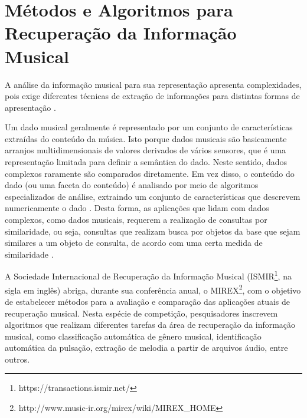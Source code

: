 \section{Métodos e Algoritmos para Recuperação da Informação Musical} \label{cap:metodos}

A análise da informação musical para sua representação apresenta complexidades, pois exige diferentes técnicas de extração de informações para distintas formas de apresentação \cite{downie2003}.

Um dado musical geralmente é representado por um conjunto de características extraídas do conteúdo da música. Isto porque dados musicais são basicamente arranjos multidimensionais de valores derivados de vários sensores, que é uma representação limitada para definir a semântica do dado. Neste sentido, dados complexos raramente são comparados diretamente. Em vez disso, o conteúdo do dado (ou uma faceta do conteúdo) é analisado por meio de algoritmos especializados de análise, extraindo um conjunto de características que descrevem numericamente o dado \cite{kaster2012}. Desta forma, as aplicações que lidam com dados complexos, como dados musicais, requerem a realização de consultas por similaridade, ou seja, consultas que realizam busca por objetos da base que sejam similares a um objeto de consulta, de acordo com uma certa medida de similaridade \cite{barioni2006}.

A Sociedade Internacional de Recuperação da Informação Musical (ISMIR\footnote{https://transactions.ismir.net/}, na sigla em inglês) abriga, durante sua conferência anual, o MIREX\footnote{http://www.music-ir.org/mirex/wiki/MIREX\_HOME}, com o objetivo de estabelecer métodos para a avaliação e comparação das aplicações atuais de recuperação musical. Nesta espécie de competição, pesquisadores inscrevem algoritmos que realizam diferentes tarefas da área de recuperação da informação musical, como classificação automática de gênero musical, identificação automática da pulsação, extração de melodia a partir de arquivos áudio, entre outros.

